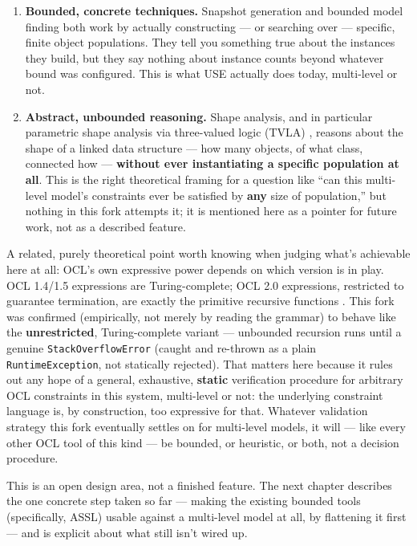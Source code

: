 \documentclass[11pt,twoside,a4paper]{book}
\begin{document}
\begin{enumerate}
\item \textbf{Bounded, concrete techniques.} Snapshot generation and bounded
model finding both work by actually constructing --- or searching
over --- specific, finite object populations. They tell you
something true about the instances they build, but they say
nothing about instance counts beyond whatever bound was configured.
This is what USE actually does today, multi-level or not.
\item \textbf{Abstract, unbounded reasoning.} Shape analysis, and in particular
parametric shape analysis via three-valued logic (TVLA)
\cite{SagivRepsWilhelm:2002}, reasons about the shape of a linked
data structure --- how many objects, of what class, connected how
--- \textbf{without ever instantiating a specific population at all}. This
is the right theoretical framing for a question like ``can this
multi-level model's constraints ever be satisfied by \textbf{any} size of
population,'' but nothing in this fork attempts it; it is mentioned
here as a pointer for future work, not as a described feature.
\end{enumerate}

A related, purely theoretical point worth knowing when judging what's
achievable here at all: OCL's own expressive power depends on which
version is in play. OCL 1.4/1.5 expressions are Turing-complete;
OCL 2.0 expressions, restricted to guarantee termination, are exactly
the primitive recursive functions \cite{CengarleKnapp:2004}. This fork
was confirmed (empirically, not merely by reading the grammar) to
behave like the \textbf{unrestricted}, Turing-complete variant --- unbounded
recursion runs until a genuine \texttt{StackOverflowError} (caught and
re-thrown as a plain \texttt{RuntimeException}, not statically rejected). That
matters here because it rules out any hope of a general, exhaustive,
\textbf{static} verification procedure for arbitrary OCL constraints in this
system, multi-level or not: the underlying constraint language is, by
construction, too expressive for that. Whatever validation strategy
this fork eventually settles on for multi-level models, it will --- like
every other OCL tool of this kind --- be bounded, or heuristic, or
both, not a decision procedure.

\begin{manualwarning}
This is an open design area, not a finished feature. The next chapter
describes the one concrete step taken so far --- making the existing
bounded tools (specifically, ASSL) usable against a multi-level model
at all, by flattening it first --- and is explicit about what still
isn't wired up.
\end{manualwarning}
\end{document}
